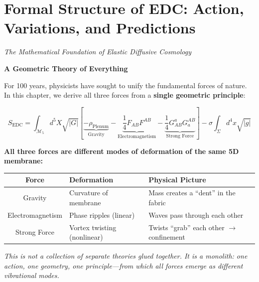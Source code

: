 \chapter{Formal Structure of EDC: Action, Variations, and Predictions}
\label{ch:theory_core}

\begin{center}
\textit{The Mathematical Foundation of Elastic Diffusive Cosmology}
\end{center}

\vspace{1em}

\begin{tcolorbox}[colback=yellow!15,colframe=red!70!black,title=\textbf{The Central Result of This Chapter}]
\begin{center}
\large\textbf{A Geometric Theory of Everything}
\end{center}

\vspace{0.5em}

For 100 years, physicists have sought to unify the fundamental forces of nature. In this chapter, we derive all three forces from a \textbf{single geometric principle}:

\begin{equation}
\boxed{S_{\text{EDC}} = \int_{\mathcal{M}_5} d^5X \sqrt{|G|} \left[ \underbrace{-\rho_{\text{Plenum}}}_{\text{Gravity}} - \underbrace{\frac{1}{4}F_{AB}F^{AB}}_{\text{Electromagnetism}} - \underbrace{\frac{1}{4}G^a_{AB}G_a^{AB}}_{\text{Strong Force}} \right] - \sigma\int_\Sigma d^4x\sqrt{|g|}}
\label{eq:unified_action}
\end{equation}

\textbf{All three forces are different modes of deformation of the same 5D membrane:}

\begin{center}
\begin{tabular}{|c|l|l|}
\hline
\textbf{Force} & \textbf{Deformation} & \textbf{Physical Picture} \\
\hline
Gravity & Curvature of membrane & Mass creates a ``dent'' in the fabric \\
\hline
Electromagnetism & Phase ripples (linear) & Waves pass through each other \\
\hline
Strong Force & Vortex twisting (nonlinear) & Twists ``grab'' each other $\to$ confinement \\
\hline
\end{tabular}
\end{center}

\vspace{0.5em}

\textit{This is not a collection of separate theories glued together. It is a monolith: one action, one geometry, one principle---from which all forces emerge as different vibrational modes.}
\end{tcolorbox}

